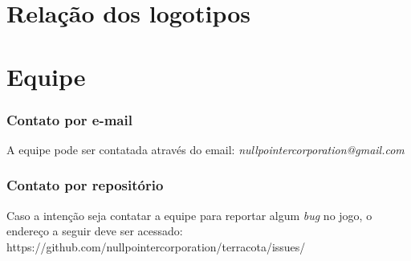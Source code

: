 \documentclass[11pt]{article}
\begin{document}
\part{Relação dos logotipos}

\newpage
\part{Equipe}
\section{Contato por e-mail}
A equipe pode ser contatada através do email: \textit{nullpointercorporation@gmail.com}

\section{Contato por repositório}
Caso a intenção seja contatar a equipe para reportar algum \textit{bug} no jogo, o endereço a seguir deve ser acessado: https://github.com/nullpointercorporation/terracota/issues/
\newpage
\end{document}
